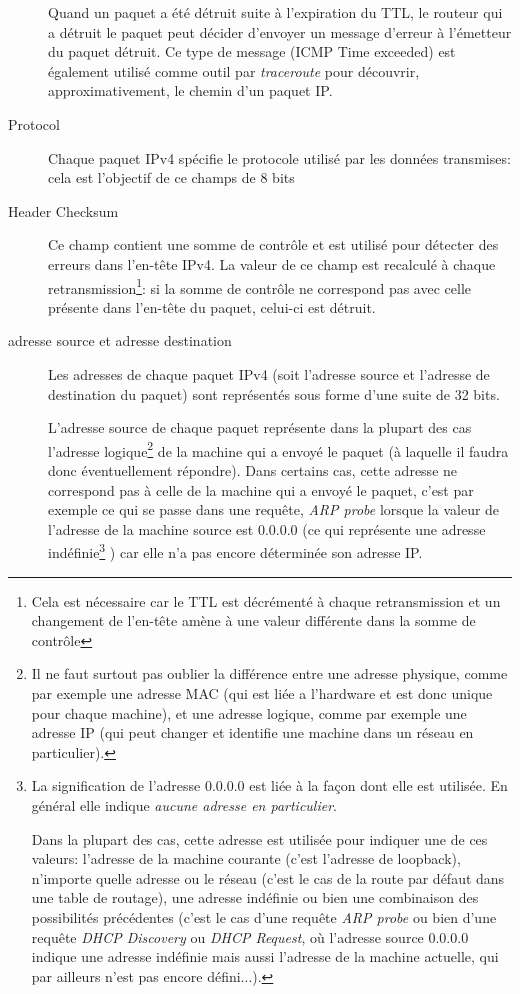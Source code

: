 \begin{description}
Quand un paquet a été détruit suite à l'expiration du TTL, le routeur qui a
détruit le paquet peut décider d'envoyer un message d'erreur à l'émetteur du
paquet détruit. Ce type de message (ICMP Time exceeded) est également utilisé comme
outil par {\it traceroute} pour découvrir, approximativement, le chemin 
d'un paquet IP.

\item [Protocol]
Chaque paquet IPv4 spécifie le protocole utilisé par les données transmises:
cela est l'objectif de ce champs de 8 bits 

\item [Header Checksum]
Ce champ contient une somme de contrôle et est utilisé pour détecter des 
erreurs dans l'en-tête IPv4. La valeur de ce champ est recalculé à
chaque retransmission\footnote {Cela est nécessaire car le TTL est décrémenté
à chaque retransmission et un changement de l'en-tête amène à une valeur différente
dans la somme de contrôle}: si la somme de contrôle ne correspond pas avec celle 
présente dans l'en-tête du paquet, celui-ci est détruit.


\item [adresse source et adresse destination]
Les adresses de chaque paquet IPv4 (soit l'adresse source et l'adresse de
destination du paquet) sont représentés sous forme d'une suite de 32 bits.

L'adresse source de chaque paquet représente dans la plupart des cas
l'adresse logique\footnote {Il ne faut surtout pas oublier la différence entre
une adresse physique, comme par exemple une adresse MAC (qui est liée a
l'hardware et est donc unique pour chaque machine), et une adresse logique,
comme par exemple une adresse IP (qui peut changer et identifie une machine
dans un réseau en particulier).} de la machine qui a envoyé le paquet
(à laquelle il faudra donc éventuellement répondre).  Dans certains cas,
 cette adresse ne correspond pas à celle de la machine qui a envoyé
le paquet, c'est par exemple ce qui se passe dans une requête, {\it ARP probe}
lorsque la valeur de l'adresse de la machine source est 0.0.0.0 (ce qui représente
une adresse indéfinie\footnote {La signification de l'adresse 0.0.0.0
est liée à la façon dont elle est utilisée. En général elle indique {\it aucune
adresse en particulier}. 

Dans la plupart des cas, cette adresse est utilisée
pour indiquer une de ces valeurs: l'adresse de la machine courante (c'est
l'adresse de loopback), n'importe quelle adresse ou le réseau (c'est le cas de la
route par défaut dans une table de routage), une adresse indéfinie ou bien une
combinaison des possibilités précédentes (c'est le cas d'une requête {\it ARP
probe} ou bien d'une requête {\it DHCP Discovery} ou {\it DHCP Request}, où
 l'adresse source 0.0.0.0 indique une adresse indéfinie mais aussi l'adresse
de la machine actuelle, qui par ailleurs n'est pas encore défini...).}
) car elle n'a pas encore déterminée son adresse IP. 


\end{description}
